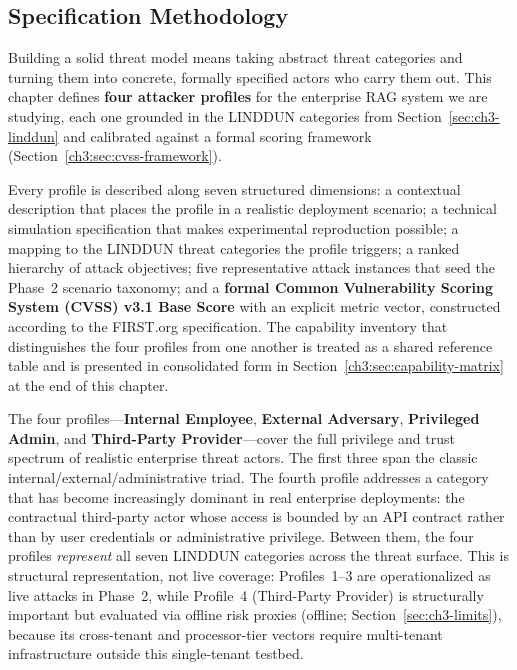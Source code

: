 \subsection{Specification Methodology}

Building a solid threat model means taking abstract threat categories and
turning them into concrete, formally specified actors who carry them out.
This chapter defines \textbf{four attacker profiles} for the enterprise RAG
system we are studying, each one grounded in the LINDDUN categories from
Section~\ref{sec:ch3-linddun} and calibrated against a formal scoring framework (Section~\ref{ch3:sec:cvss-framework}).

Every profile is described along seven structured dimensions: a contextual
description that places the profile in a realistic deployment scenario; a
technical simulation specification that makes experimental reproduction
possible; a mapping to the LINDDUN threat categories the profile triggers;
a ranked hierarchy of attack objectives; five representative attack
instances that seed the Phase~2 scenario taxonomy; and a \textbf{formal Common Vulnerability Scoring System (CVSS)
v3.1 Base Score} with an explicit metric vector, constructed according
to the FIRST.org specification. The capability inventory that distinguishes
the four profiles from one another is treated as a shared reference table
and is presented in consolidated form in Section~\ref{ch3:sec:capability-matrix}
at the end of this chapter.

The four profiles---\textbf{Internal Employee}, \textbf{External Adversary},
\textbf{Privileged Admin}, and \textbf{Third-Party Provider}---cover the
full privilege and trust spectrum of realistic enterprise threat actors.
The first three span the classic internal/external/administrative triad.
The fourth profile addresses a category that has become increasingly
dominant in real enterprise deployments: the contractual third-party
actor whose access is bounded by an API contract rather than by user
credentials or administrative privilege. Between them, the four profiles
\emph{represent} all seven LINDDUN categories across the threat surface.
This is structural representation, not live coverage: Profiles~1--3 are
operationalized as live attacks in Phase~2, while Profile~4 (Third-Party
Provider) is structurally important but evaluated via offline risk proxies
(offline; Section~\ref{sec:ch3-limits}), because its cross-tenant and processor-tier vectors
require multi-tenant infrastructure outside this single-tenant testbed.


